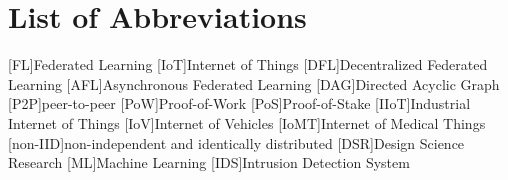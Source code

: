\chapter*{List of Abbreviations}

\begin{acronym}[ECU]
[FL]{Federated Learning}
[IoT]{Internet of Things}
[DFL]{Decentralized Federated Learning}
[AFL]{Asynchronous Federated Learning}
[DAG]{Directed Acyclic Graph}
[P2P]{peer-to-peer}
[PoW]{Proof-of-Work}
[PoS]{Proof-of-Stake}
[IIoT]{In\-dus\-tri\-al Internet of Things}
[IoV]{Internet of Vehicles}
[IoMT]{Internet of Medical Things}
[non-IID]{non-independent and identically distributed}
[DSR]{Design Science Research}
[ML]{Machine Learning}
[IDS]{Intrusion Detection System}
\end{acronym}




